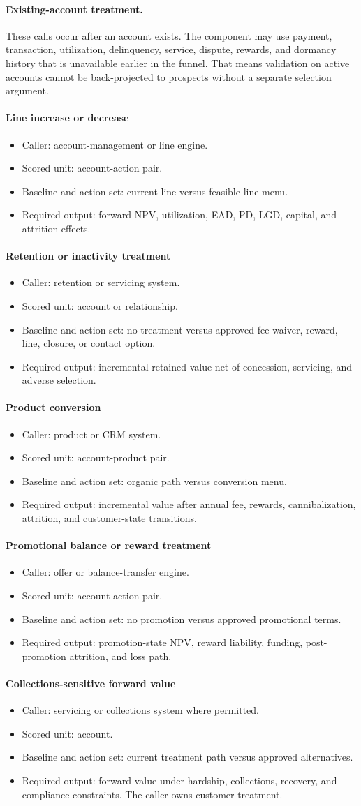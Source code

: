\documentclass[11pt]{article}
\newcommand{\1}{\mathbf{1}}
\newcommand{\contractitem}[2]{\paragraph{#1}\begin{itemize}[leftmargin=1.5em,itemsep=0.12em,topsep=0.18em]#2\end{itemize}}
\begin{document}
\paragraph{Existing-account treatment.}
These calls occur after an account exists. The component may use payment,
transaction, utilization, delinquency, service, dispute, rewards, and dormancy
history that is unavailable earlier in the funnel. That means validation on
active accounts cannot be back-projected to prospects without a separate
selection argument.

\contractitem{Line increase or decrease}{
  \item Caller: account-management or line engine.
  \item Scored unit: account-action pair.
  \item Baseline and action set: current line versus feasible line menu.
  \item Required output: forward NPV, utilization, EAD, PD, LGD, capital, and
        attrition effects.
}
\contractitem{Retention or inactivity treatment}{
  \item Caller: retention or servicing system.
  \item Scored unit: account or relationship.
  \item Baseline and action set: no treatment versus approved fee waiver,
        reward, line, closure, or contact option.
  \item Required output: incremental retained value net of concession,
        servicing, and adverse selection.
}
\contractitem{Product conversion}{
  \item Caller: product or CRM system.
  \item Scored unit: account-product pair.
  \item Baseline and action set: organic path versus conversion menu.
  \item Required output: incremental value after annual fee, rewards,
        cannibalization, attrition, and customer-state transitions.
}
\contractitem{Promotional balance or reward treatment}{
  \item Caller: offer or balance-transfer engine.
  \item Scored unit: account-action pair.
  \item Baseline and action set: no promotion versus approved promotional
        terms.
  \item Required output: promotion-state NPV, reward liability, funding,
        post-promotion attrition, and loss path.
}
\contractitem{Collections-sensitive forward value}{
  \item Caller: servicing or collections system where permitted.
  \item Scored unit: account.
  \item Baseline and action set: current treatment path versus approved
        alternatives.
  \item Required output: forward value under hardship, collections, recovery,
        and compliance constraints. The caller owns customer treatment.
}
\end{document}
